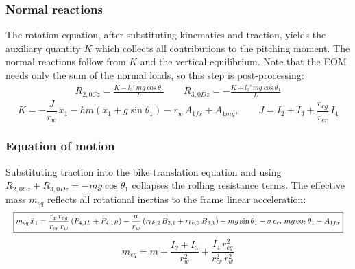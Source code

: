 \documentclass[10pt]{extarticle}
\numberwithin{equation}{subsubsection}
\begin{document}
\subsubsection{Normal reactions}

The rotation equation, after substituting kinematics and traction, yields the auxiliary quantity $K$ which collects all contributions to the pitching moment. The normal reactions follow from $K$ and the vertical equilibrium. Note that the EOM needs only the sum of the normal loads, so this step is post-processing:
\begin{align}
    \boxed{R_{2,0Cz} = \frac{K - l_3'\,mg\cos\theta_1}{L}} \qquad
    \boxed{R_{3,0Dz} = -\frac{K + l_2'\,mg\cos\theta_1}{L}}
\end{align}
\begin{equation}
    K = -\frac{J}{r_w}\,\ddot{x}_1
        - hm\!\left(\ddot{x}_1 + g\sin\theta_1\right)
        - r_w\,A_{1fx} + A_{1my},
    \qquad
    J = I_2 + I_3 + \frac{r_{cg}}{r_{cr}}\,I_4
\end{equation}

\subsubsection{Equation of motion}

Substituting traction into the bike translation equation and using $R_{2,0Cz} + R_{3,0Dz} = -mg\cos\theta_1$ collapses the rolling resistance terms. The effective mass $m_{eq}$ reflects all rotational inertias to the frame linear acceleration:
\begin{equation}
    \resizebox{\linewidth}{!}{$\displaystyle
    \boxed{
    m_{eq}\,\ddot{x}_1 =
        \frac{r_p\,r_{cg}}{r_{cr}\,r_w}\left(P_{4,1L} + P_{4,1R}\right)
        - \frac{\sigma}{r_w}\left(r_{bk,2}\,B_{2,1} + r_{bk,3}\,B_{3,1}\right)
        - mg\sin\theta_1
        - \sigma\,c_{rr}\,mg\cos\theta_1
        - A_{1fx}
    }$}
\end{equation}
\begin{equation}
    m_{eq} = m + \frac{I_2 + I_3}{r_w^2} + \frac{I_4\,r_{cg}^2}{r_{cr}^2\,r_w^2}
\end{equation}
\end{document}
